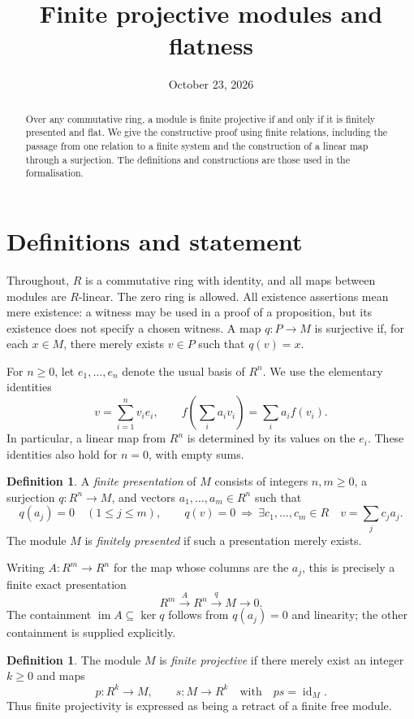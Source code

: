 \documentclass[11pt]{amsart}
\title{Finite projective modules and flatness}
\date{October 23, 2026}
\theoremstyle{definition}
\newtheorem{definition}[theorem]{Definition}
\newcommand{\id}{\operatorname{id}}
\begin{document}
\begin{abstract}
Over any commutative ring, a module is finite projective if and only if
it is finitely presented and flat. We give the constructive proof using
finite relations, including the passage from one relation to a finite
system and the construction of a linear map through a surjection.
The definitions and constructions are those used in the formalisation.
\end{abstract}
\maketitle

\section{Definitions and statement}

Throughout, $R$ is a commutative ring with identity, and all maps between
modules are $R$-linear. The zero ring is allowed. All existence
assertions mean mere existence: a witness may be used in a proof of a
proposition, but its existence does not specify a chosen witness. A map
$q:P\to M$ is surjective if, for each $x\in M$, there merely exists
$v\in P$ such that $q(v)=x$.

For $n\geq0$, let $e_1,\ldots,e_n$ denote the usual basis of $R^n$.
We use the elementary identities
\[
 v=\sum_{i=1}^n v_i e_i,\qquad
 f\left(\sum_i a_i v_i\right)=\sum_i a_i f(v_i).
\]
In particular, a linear map from $R^n$ is determined by its values on
the $e_i$. These identities also hold for $n=0$, with empty sums.

\begin{definition}\label{def:fp}
A \emph{finite presentation} of $M$ consists of integers $n,m\geq0$,
a surjection $q:R^n\to M$, and vectors $a_1,\ldots,a_m\in R^n$ such that
\[
 q(a_j)=0\quad(1\leq j\leq m),\qquad
 q(v)=0\ \Longrightarrow\
 \exists c_1,\ldots,c_m\in R\quad v=\sum_j c_j a_j.
\]
The module $M$ is \emph{finitely presented} if such a presentation
merely exists.
\end{definition}

Writing $A:R^m\to R^n$ for the map whose columns are the $a_j$, this
is precisely a finite exact presentation
\[
 R^m\xrightarrow{A}R^n\xrightarrow{q}M\longrightarrow0.
\]
The containment $\operatorname{im}A\subseteq\ker q$ follows from
$q(a_j)=0$ and linearity; the other containment is supplied explicitly.

\begin{definition}\label{def:projective}
The module $M$ is \emph{finite projective} if there merely exist an
integer $k\geq0$ and maps
\[
 p:R^k\longrightarrow M,\qquad s:M\longrightarrow R^k
 \quad\text{with}\quad ps=\id_M.
\]
Thus finite projectivity is expressed as being a retract of a finite
free module.
\end{definition}
\end{document}
